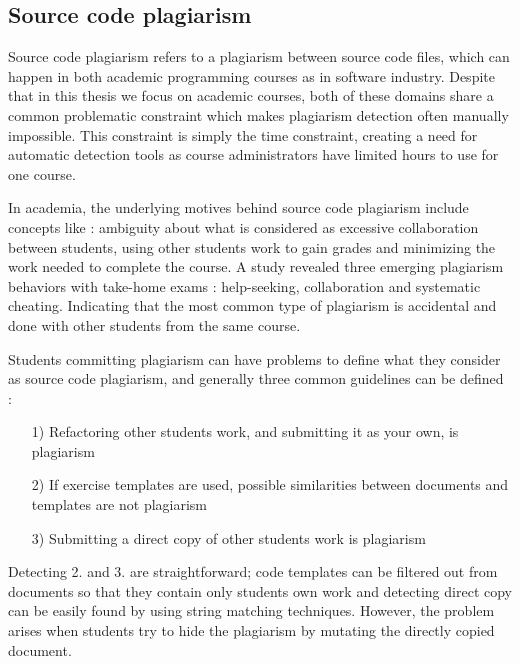 \subsection{Source code plagiarism} \label{chap-bg-sc-plag}

Source code plagiarism refers to a plagiarism between source code files, which can happen in both academic programming courses as in software industry. Despite that in this thesis we focus on academic courses, both of these domains share a common problematic constraint which makes plagiarism detection often manually impossible. This constraint is simply the time constraint, creating a need for automatic detection tools as course administrators have limited hours to use for one course. 

In academia, the underlying motives behind source code plagiarism include concepts like \cite{PlagInProg1999}: ambiguity about what is considered as excessive collaboration between students, using other students work to gain grades and minimizing the work needed to complete the course. A study revealed three emerging plagiarism behaviors with take-home exams \cite{Hellas:2017:PTE:3059009.3059065}: help-seeking, collaboration and systematic cheating. Indicating that the most common type of plagiarism is accidental and done with other students from the same course.

Students committing plagiarism can have problems to define what they consider as source code plagiarism, and generally three common guidelines can be defined \cite{Pieterse2014DecodingCP}:

\begin{enumerate}
    \item[1)] Refactoring other students work, and submitting it as your own, is plagiarism
    \item[2)] If exercise templates are used, possible similarities between documents and templates are not plagiarism
    \item[3)] Submitting a direct copy of other students work is plagiarism
\end{enumerate}

\noindent
Detecting 2. and 3. are straightforward; code templates can be filtered out from documents so that they contain only students own work and detecting direct copy can be easily found by using string matching techniques. However, the problem arises when students try to hide the plagiarism by mutating the directly copied document.

